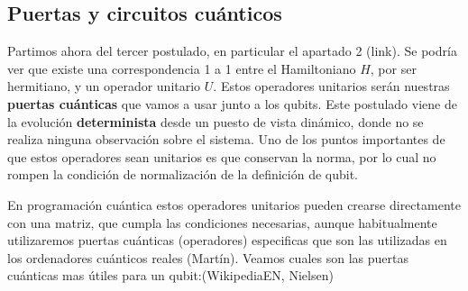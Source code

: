 \newpage
\subsection{Puertas y circuitos cuánticos}

 Partimos ahora del tercer postulado, en particular el apartado 2 (link). Se podría ver que existe una correspondencia 1 a 1 entre el Hamiltoniano $H$, por ser hermitiano, y un operador unitario $U$. Estos operadores unitarios serán nuestras \textbf{puertas cuánticas} que vamos a usar junto a los qubits. Este postulado viene de la evolución \textbf{determinista} desde un puesto de vista dinámico, donde no se realiza ninguna observación sobre el sistema. Uno de los puntos importantes de que estos operadores sean unitarios es que conservan la norma, por lo cual no rompen la condición de normalización de la definición de qubit. \newline
 
 En programación cuántica estos operadores unitarios pueden crearse directamente con una matriz, que cumpla las condiciones necesarias, aunque habitualmente utilizaremos puertas cuánticas (operadores) especificas que son las utilizadas en los ordenadores cuánticos reales (Martín). Veamos cuales son las puertas cuánticas mas útiles para un qubit:(WikipediaEN, Nielsen)

